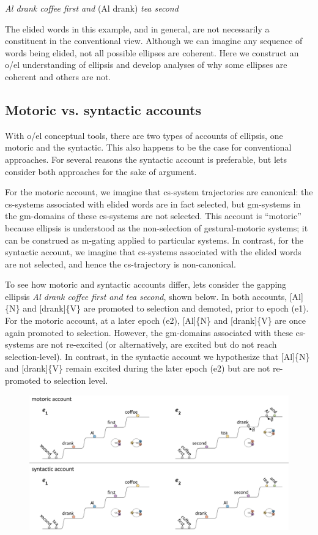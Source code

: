     \textit{Al drank coffee first and} (Al drank) \textit{tea second}

  The elided words in this example, and in general, are not necessarily a constituent in the conventional view. Although we can imagine any sequence of words being elided, not all possible ellipses are coherent. Here we construct an o/el understanding of ellipsis and develop analyses of why some ellipses are coherent and others are not.

\subsection{Motoric vs. syntactic accounts}

With o/el conceptual tools, there are two types of accounts of ellipsis, one motoric and the syntactic. This also happens to be the case for conventional approaches. For several reasons the syntactic account is preferable, but lets consider both approaches for the sake of argument. 

  For the motoric account, we imagine that cs-system trajectories are canonical: the cs-systems associated with elided words are in fact selected, but gm-systems in the gm-domains of these cs-systems are not selected. This account is “motoric” because ellipsis is understood as the non-selection of gestural-motoric systems; it can be construed as m-gating applied to particular systems. In contrast, for the syntactic account, we imagine that cs-systems associated with the elided words are not selected, and hence the cs-trajectory is non-canonical.

  To see how motoric and syntactic accounts differ, lets consider the gapping ellipsis \textit{Al drank coffee first and tea second}, shown below. In both accounts, [Al]\{N\} and [drank]\{V\} are promoted to selection and demoted, prior to epoch (e1). For the motoric account, at a later epoch (e2), [Al]\{N\} and [drank]\{V\} are once again promoted to selection. However, the gm-domains associated with these cs-systems are not re-excited (or alternatively, are excited but do not reach selection-level). In contrast, in the syntactic account we hypothesize that [Al]\{N\} and [drank]\{V\} remain excited during the later epoch (e2) but are not re-promoted to selection level. 

  
\begin{figure}
\includegraphics[width=\textwidth]{figures/Tilsen-img145.png}
\caption{\missingcaption}
\label{fig:}
\end{figure}
 

